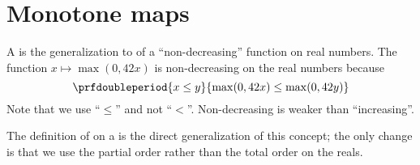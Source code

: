 
\section{Monotone maps}
\label{sec:monotonicity-monotone-maps}


A  is the generalization to  of a ``non-decreasing'' function on real numbers.
The function $x \mapsto \max(0, 42 x)$ is non-decreasing on the real numbers because
\begin{equation}\label{eq:monotone-eq-1}
    \prfdoubleperiod{
        x \leq y
    }{
        \max(0, 42 x) \leq \max(0, 42 y)
    }
\end{equation}
Note that we use ``$\leq$'' and not ``$<$''.
Non-decreasing is weaker than ``increasing''.

The definition of  on a  is the direct generalization of this concept; the only change is that we use the partial order rather than the total order on the reals.

